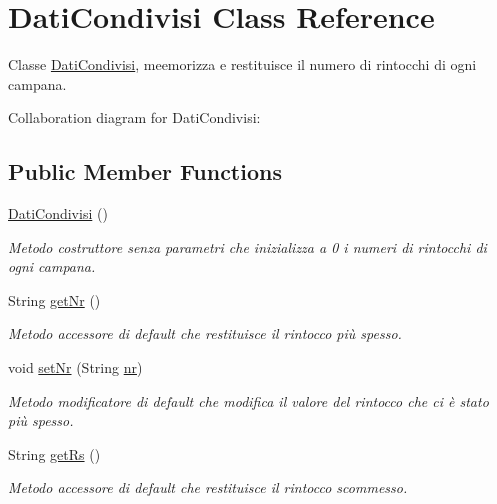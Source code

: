 \hypertarget{classcampane_1_1_dati_condivisi}{}\section{Dati\+Condivisi Class Reference}
\label{classcampane_1_1_dati_condivisi}


Classe \hyperlink{classcampane_1_1_dati_condivisi}{Dati\+Condivisi}, meemorizza e restituisce il numero di rintocchi di ogni campana.  




Collaboration diagram for Dati\+Condivisi\+:
\subsection*{Public Member Functions}
\begin{DoxyCompactItemize}
\item 
\hyperlink{classcampane_1_1_dati_condivisi_a2ce548a424ea84b9b0c891bdf07ff2de}{Dati\+Condivisi} ()
\begin{DoxyCompactList}\small\item\em Metodo costruttore senza parametri che inizializza a 0 i numeri di rintocchi di ogni campana. \end{DoxyCompactList}\item 
String \hyperlink{classcampane_1_1_dati_condivisi_aa769980e82eedce2d8b5d3f136848bbb}{get\+Nr} ()
\begin{DoxyCompactList}\small\item\em Metodo accessore di default che restituisce il rintocco più spesso. \end{DoxyCompactList}\item 
void \hyperlink{classcampane_1_1_dati_condivisi_a7279779585b56f536bb0e0cb30d07046}{set\+Nr} (String \hyperlink{classcampane_1_1_dati_condivisi_ae008b53823e232ad42a78357f1f8069e}{nr})
\begin{DoxyCompactList}\small\item\em Metodo modificatore di default che modifica il valore del rintocco che ci è stato più spesso. \end{DoxyCompactList}\item 
String \hyperlink{classcampane_1_1_dati_condivisi_a5998b9f2470790e4f3f8d831acfd7d9e}{get\+Rs} ()
\begin{DoxyCompactList}\small\item\em Metodo accessore di default che restituisce il rintocco scommesso. \end{DoxyCompactList}\item 

\end{DoxyCompactItemize}
